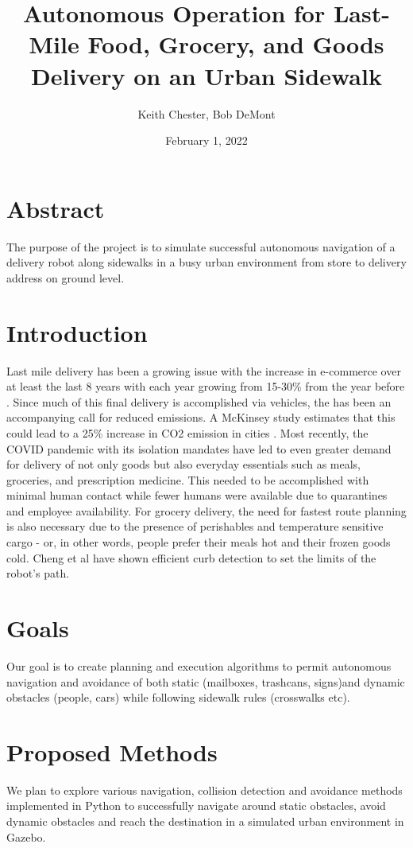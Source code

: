 \documentclass{article}
\title{Autonomous Operation for Last-Mile Food, Grocery, and Goods Delivery on an Urban Sidewalk }
\author{Keith Chester, Bob DeMont}
\date{February 1, 2022}
\begin{document}
\maketitle


\begin{multicols}{2}
\section*{Abstract}
The purpose of the project is to simulate successful autonomous navigation of a delivery robot along sidewalks in a busy urban environment from store to delivery address on ground level.

\section*{Introduction}
Last mile delivery has been a growing issue with the increase in e-commerce over at least the last 8 years with each year growing from 15-30\% from the year before \cite{Ecom}.  Since much of this final delivery is accomplished via vehicles, the has been an accompanying call for reduced emissions.  A McKinsey study estimates that this could lead to a 25\% increase in CO2 emission in cities \cite{Emiss}.  Most recently, the COVID pandemic with its isolation mandates have led to even greater demand for delivery of not only goods but also everyday essentials such as meals, groceries, and prescription medicine.  This needed to be accomplished with minimal human contact while fewer humans were available due to quarantines and employee availability.  For grocery delivery, the need for fastest route planning is also necessary due to the presence of perishables and temperature sensitive cargo - or, in other words, people prefer their meals hot and their frozen goods cold. Cheng et al \cite{Mcheng} have shown efficient curb detection to set the limits of the robot's path.

\section*{Goals}
Our goal is to create planning and execution algorithms to permit autonomous navigation and avoidance of both static (mailboxes, trashcans, signs)and dynamic obstacles (people, cars) while following sidewalk rules (crosswalks etc).

\section*{Proposed Methods}
We plan to explore various navigation, collision detection and avoidance methods implemented in Python to successfully navigate around static obstacles, avoid dynamic obstacles  and reach the destination in a simulated urban environment in Gazebo.


\end{multicols}
\end{document}
